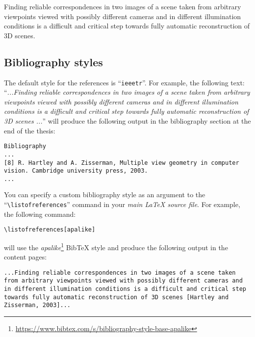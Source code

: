 \lipsum[1]\cite{barker1987pulse,peacock1998oxygen,moller1993randomized}


Finding reliable correspondences in two images of a scene taken from arbitrary viewpoints viewed with possibly different cameras and in different illumination conditions is a difficult and critical step towards fully automatic reconstruction of 3D scenes\cite{hartley2003multiple}.

\lipsum[7]\cite{priya2012transition,haralick1973textural,Grass2012Online,NoninPulseOxOnline}


\subsection{Bibliography styles}


The default style for the references is ``\verb|ieeetr|''. For example, the following text: ``\textit{...Finding reliable correspondences in two images of a scene taken from arbitrary viewpoints viewed with possibly different cameras and in different illumination conditions is a difficult and critical step towards fully automatic reconstruction of 3D scenes \cite{hartley2003multiple}...}'' will produce the following output in the bibliography section at the end of the thesis:


\begin{lstlisting}[style=custom-text]
Bibliography
...
[8] R. Hartley and A. Zisserman, Multiple view geometry in computer vision. Cambridge university press, 2003.
...
\end{lstlisting}


You can specify a custom bibliography style as an argument to the ``\verb|\listofreferences|'' command in your \textit{main LaTeX source file}. For example, the following command:


\begin{lstlisting}[style=custom-latex]
\listofreferences[apalike]
\end{lstlisting}


\noindent will use the \textit{apalike}\footnote{\url{https://www.bibtex.com/s/bibliography-style-base-apalike}}
BibTeX style and produce the following output in the content pages:


\begin{lstlisting}[style=custom-text]
...Finding reliable correspondences in two images of a scene taken from arbitrary viewpoints viewed with possibly different cameras and in different illumination conditions is a difficult and critical step towards fully automatic reconstruction of 3D scenes [Hartley and Zisserman, 2003]...
\end{lstlisting}


